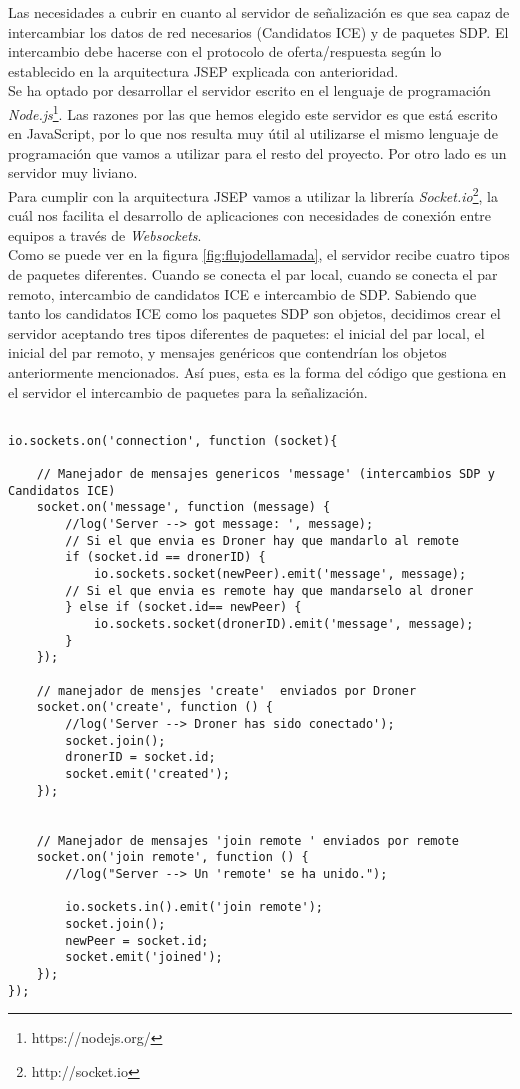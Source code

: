 Las necesidades a cubrir en cuanto al servidor de señalización es que sea capaz de intercambiar los datos de red necesarios (Candidatos ICE) y de paquetes SDP. El intercambio debe hacerse con el protocolo de oferta/respuesta según lo establecido en la arquitectura JSEP explicada con anterioridad.\\

Se ha optado por desarrollar el servidor escrito en el lenguaje de programación \emph{Node.js}\footnote{https://nodejs.org/}. Las razones por las que hemos elegido este servidor es que está escrito en JavaScript, por lo que nos resulta muy útil al utilizarse el mismo lenguaje de programación que vamos a utilizar para el resto del proyecto. Por otro lado es un servidor muy liviano.\\

Para cumplir con la arquitectura JSEP vamos a utilizar la librería \emph{Socket.io}\footnote{http://socket.io}, la cuál nos facilita el desarrollo de aplicaciones con necesidades de conexión entre equipos a través de \emph{Websockets}.\\

Como se puede ver en la figura \ref{fig:flujodellamada}, el servidor recibe cuatro tipos de paquetes diferentes. Cuando se conecta el par local, cuando se conecta el par remoto, intercambio de candidatos ICE e intercambio de SDP. Sabiendo que tanto los candidatos ICE como los paquetes SDP son objetos, decidimos crear el servidor aceptando tres tipos diferentes de paquetes: el inicial del par local, el inicial del par remoto, y mensajes genéricos que contendrían los objetos anteriormente mencionados. Así pues, esta es la forma del código que gestiona en el servidor el intercambio de paquetes para la señalización.\\

\begin{lstlisting}[caption=Núcleo servidor de señalización]

io.sockets.on('connection', function (socket){

	// Manejador de mensajes genericos 'message' (intercambios SDP y Candidatos ICE)
	socket.on('message', function (message) {
		//log('Server --> got message: ', message);
		// Si el que envia es Droner hay que mandarlo al remote
		if (socket.id == dronerID) {
			io.sockets.socket(newPeer).emit('message', message);
		// Si el que envia es remote hay que mandarselo al droner
		} else if (socket.id== newPeer) {
			io.sockets.socket(dronerID).emit('message', message);
		} 
	});

	// manejador de mensjes 'create'  enviados por Droner
	socket.on('create', function () {
		//log('Server --> Droner has sido conectado');
		socket.join();
		dronerID = socket.id;
		socket.emit('created');
	});
	

	// Manejador de mensajes 'join remote ' enviados por remote
	socket.on('join remote', function () {
		//log("Server --> Un 'remote' se ha unido.");
		
		io.sockets.in().emit('join remote');
		socket.join();
		newPeer = socket.id;
		socket.emit('joined');
	});
});
\end{lstlisting}

